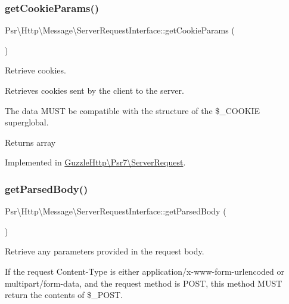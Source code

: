 \subsubsection{\texorpdfstring{get\+Cookie\+Params()}{getCookieParams()}}
{\footnotesize\ttfamily Psr\textbackslash{}\+Http\textbackslash{}\+Message\textbackslash{}\+Server\+Request\+Interface\+::get\+Cookie\+Params (\begin{DoxyParamCaption}{ }\end{DoxyParamCaption})}

Retrieve cookies.

Retrieves cookies sent by the client to the server.

The data M\+U\+ST be compatible with the structure of the \$\+\_\+\+C\+O\+O\+K\+IE superglobal.

\begin{DoxyReturn}{Returns}
array 
\end{DoxyReturn}


Implemented in \hyperlink{classGuzzleHttp_1_1Psr7_1_1ServerRequest_ad20159691edfb8d604ef055c52191733}{Guzzle\+Http\textbackslash{}\+Psr7\textbackslash{}\+Server\+Request}.

\mbox{\label{interfacePsr_1_1Http_1_1Message_1_1ServerRequestInterface_adea56ff4819890170ede9220c25cfbb1}} 
\subsubsection{\texorpdfstring{get\+Parsed\+Body()}{getParsedBody()}}
{\footnotesize\ttfamily Psr\textbackslash{}\+Http\textbackslash{}\+Message\textbackslash{}\+Server\+Request\+Interface\+::get\+Parsed\+Body (\begin{DoxyParamCaption}{ }\end{DoxyParamCaption})}

Retrieve any parameters provided in the request body.

If the request Content-\/\+Type is either application/x-\/www-\/form-\/urlencoded or multipart/form-\/data, and the request method is P\+O\+ST, this method M\+U\+ST return the contents of \$\+\_\+\+P\+O\+ST.

